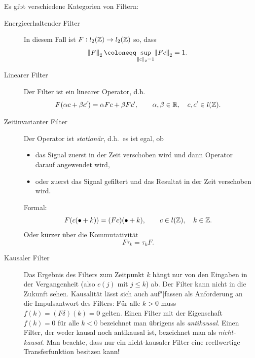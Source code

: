 \begin{remark}[Filtertypen]
Es gibt verschiedene Kategorien von Filtern:
\begin{description}
\item [Energieerhaltender Filter]
  In diesem Fall ist $ F : l_{2}(\mathbb{Z}) \rightarrow l_{2}(\mathbb{Z}) $ so, dass
  \[
    \norm{F}_{2} \coloneqq \sup_{\norm{c}_{2} = 1} \norm{Fc}_{2} = 1.
  \]
\item [Linearer Filter]
  Der Filter ist ein linearer Operator, d.h.\
  \[
    F(\alpha c + \beta c') = \alpha Fc + \beta Fc', \qquad \alpha, \beta \in \mathbb{R}, 
                                                    \quad c, c' \in l(\mathbb{Z}).
  \]
\item [Zeitinvarianter Filter]
  Der Operator ist \emph{stationär}, d.h.\ es ist egal, ob
  \begin{itemize}
  \item das Signal zuerst in der Zeit verschoben wird und dann Operator darauf angewendet wird,
  \item oder zuerst das Signal gefiltert und das Resultat in der Zeit verschoben wird.
  \end{itemize}
  Formal:
  \[
    F(c(\bullet + k)) = (Fc)(\bullet + k), \qquad c \in l(\mathbb{Z}), \quad k \in \mathbb{Z}.
  \]
  Oder kürzer über die Kommutativität
  \[
    F\tau_{k} = \tau_{k}F.
  \]
\item [Kausaler Filter]
  Das Ergebnis des Filters zum Zeitpunkt $ k $ hängt nur von den Eingaben in der Vergangenheit
  (also $ c(j) $ mit $ j \leq k $) ab. Der Filter kann nicht in die Zukunft sehen. Kausalität
  lässt sich auch auf"|fassen als Anforderung an die Impulsantwort des Filters: Für alle $ k > 0 $
  muss $ f(k) = (F\delta)(k) = 0 $ gelten. Einen Filter mit der Eigenschaft $ f(k) = 0 $ für alle
  $ k < 0 $ bezeichnet man übrigens als \emph{antikausal}. Einen Filter, der weder kausal noch
  antikausal ist, bezeichnet man als \emph{nicht-kausal}. Man beachte, dass nur ein nicht-kausaler
  Filter eine reellwertige Transferfunktion besitzen kann!
\end{description}
\end{remark}

